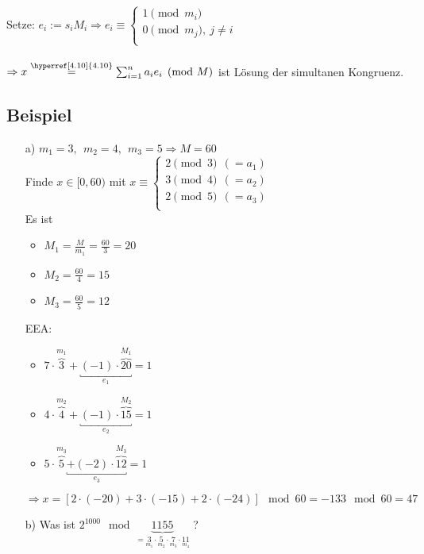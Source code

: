 \documentclass[a4paper, 12pt,titlepage, pdf, headsepline]{scrartcl}
\renewcommand{\>}{\rightarrow}
\renewcommand{\*}{\cdot}
\begin{document}
	      Setze: $e_i := s_i M_i \Rightarrow e_i \equiv \begin{cases*}
	      1 \pmod{m_i} \\
	      0 \pmod{m_j},~ j \neq i\\
	\end{cases*}$ \\
	\\
	$\Rightarrow x \overset{\textrm{\hyperref[4.10]{4.10}}}{=} \sum_{i = 1}^{n}a_i e_i \pmod{M} $ ist Lösung der simultanen Kongruenz.
	\subsection{Beispiel}
	\begin{itemize}
		\item[a)] $m_1 = 3, ~~m_2 = 4, ~~m_3 = 5 \Rightarrow M = 60$\\
		      Finde $x \in [0,60)$ mit $x \equiv \begin{cases*}
		      	2 \pmod 3~~(=a_1)\\
		      	3 \pmod 4~~(=a_2)\\
		      	2 \pmod 5~~(=a_3)\\
		      	\end{cases*}$ \\
		      	Es ist 
		      	\begin{itemize}
		      		\item $M_1 = \frac{M}{m_1} = \frac{60}{3} = 20$ 
		      		\item  $M_2 = \frac{60}{4} = 15$
		      		\item $M_3 = \frac{60}{5} = 12$ 
		      	\end{itemize}
		      	EEA: 
		      	\begin{itemize}
		      		\item $7 \cdot \overbrace{3}^{m_1} + \underbracket{(-1) \cdot \overbrace{20}^{M_1}}_{e_1} = 1$
		      		\item $4 \cdot \overbrace{4}^{m_2} + \underbracket{(-1) \cdot \overbrace{15}^{M_2}}_{e_2} = 1$
		      		\item $5 \cdot \overbrace{5}^{m_3} \underbracket{+ (-2) \cdot \overbrace{12}^{M_3}}_{e_3} = 1$
		      	\end{itemize}
		      	$\Rightarrow x = [2 \cdot (-20) + 3 \cdot (-15) + 2 \cdot (-24)] \mod 60  =-133\mod 60= 47$
		      	\item[b)] Was ist $2^{1000} \mod \underbrace{1155}_{=\underset{m_1}{3} \cdot \underset{m_2}{5} \cdot \underset{m_3}{7} \cdot \underset{m_4}{11}}$ ?

\end{itemize}
\end{document}
